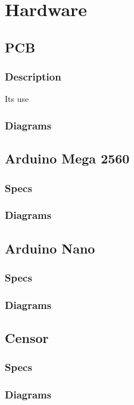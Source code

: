 \chapter{Hardware}

\section{PCB}

\subsection{Description}
Its use
\subsection{Diagrams}

\section{Arduino Mega 2560}

\subsection{Specs}

\subsection{Diagrams}

\section{Arduino Nano}

\subsection{Specs}

\subsection{Diagrams}

\section{Censor}

\subsection{Specs}

\subsection{Diagrams}